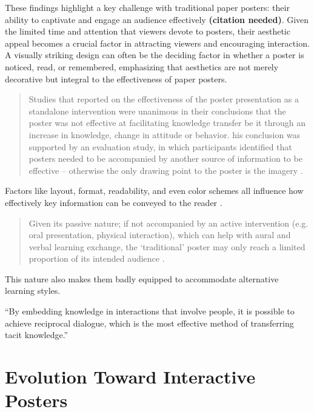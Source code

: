 These findings highlight a key challenge with traditional paper posters: their ability to captivate and engage an audience effectively \textbf{(citation needed)}. Given the limited time and attention that viewers devote to posters, their aesthetic appeal becomes a crucial factor in attracting viewers and encouraging interaction\cite{goodhand}. A visually striking design can often be the deciding factor in whether a poster is noticed, read, or remembered, emphasizing that aesthetics are not merely decorative but integral to the effectiveness of paper posters\cite{Erren, Arslan, Mabrouk}.
\begin{quote}
	Studies that reported on the effectiveness of the poster presentation as a standalone intervention were unanimous in their conclusions that the poster was not effective at facilitating knowledge transfer be it through an increase in knowledge, change in attitude or behavior. his conclusion was supported by an evaluation study, in which participants identified that posters needed to be accompanied by another source of information to be effective – otherwise the only drawing point to the poster is the imagery \cite{IlicRowe1}.
\end{quote} 
Factors like layout, format, readability, and even color schemes all influence how effectively key information can be conveyed to the reader \cite{IlicRowe1, Erren}.\\

\begin{quote}
	Given its passive nature; if not accompanied by an active intervention (e.g. oral presentation, physical interaction), which can help with aural and verbal learning exchange, the ‘traditional’ poster may only reach a limited proportion of its intended audience \cite{IlicRowe1}. 
\end{quote}
This nature also makes them badly equipped to accommodate alternative learning styles.\cite{IlicRowe4} 

\enquote{By embedding knowledge in interactions that involve people, it is possible to achieve reciprocal dialogue, which is the most effective method of transferring tacit knowledge.} \cite{IlicRowe1}

\section{Evolution Toward Interactive Posters}
